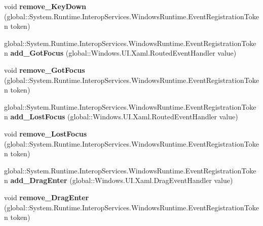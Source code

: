 \begin{DoxyCompactItemize}
void {\bfseries remove\+\_\+\+Key\+Down} (global\+::\+System.\+Runtime.\+Interop\+Services.\+Windows\+Runtime.\+Event\+Registration\+Token token)
\item 
\mbox{\label{interface_windows_1_1_u_i_1_1_xaml_1_1_i_u_i_element_a96e9e3b3d2456f96d2113018911c4223}} 
global\+::\+System.\+Runtime.\+Interop\+Services.\+Windows\+Runtime.\+Event\+Registration\+Token {\bfseries add\+\_\+\+Got\+Focus} (global\+::\+Windows.\+U\+I.\+Xaml.\+Routed\+Event\+Handler value)
\item 
\mbox{\label{interface_windows_1_1_u_i_1_1_xaml_1_1_i_u_i_element_ac7da9e77287c0c2d8bdfd22d90914fb3}} 
void {\bfseries remove\+\_\+\+Got\+Focus} (global\+::\+System.\+Runtime.\+Interop\+Services.\+Windows\+Runtime.\+Event\+Registration\+Token token)
\item 
\mbox{\label{interface_windows_1_1_u_i_1_1_xaml_1_1_i_u_i_element_a8eff735911e4175474bbec6b8aa79b15}} 
global\+::\+System.\+Runtime.\+Interop\+Services.\+Windows\+Runtime.\+Event\+Registration\+Token {\bfseries add\+\_\+\+Lost\+Focus} (global\+::\+Windows.\+U\+I.\+Xaml.\+Routed\+Event\+Handler value)
\item 
\mbox{\label{interface_windows_1_1_u_i_1_1_xaml_1_1_i_u_i_element_a735a5482f18ebef41ee23b3508022834}} 
void {\bfseries remove\+\_\+\+Lost\+Focus} (global\+::\+System.\+Runtime.\+Interop\+Services.\+Windows\+Runtime.\+Event\+Registration\+Token token)
\item 
\mbox{\label{interface_windows_1_1_u_i_1_1_xaml_1_1_i_u_i_element_a2fed84aaafd99d2ab6c95997a486fc7a}} 
global\+::\+System.\+Runtime.\+Interop\+Services.\+Windows\+Runtime.\+Event\+Registration\+Token {\bfseries add\+\_\+\+Drag\+Enter} (global\+::\+Windows.\+U\+I.\+Xaml.\+Drag\+Event\+Handler value)
\item 
\mbox{\label{interface_windows_1_1_u_i_1_1_xaml_1_1_i_u_i_element_a5a5960af1b1feea08a32346a9df72973}} 
void {\bfseries remove\+\_\+\+Drag\+Enter} (global\+::\+System.\+Runtime.\+Interop\+Services.\+Windows\+Runtime.\+Event\+Registration\+Token token)

\end{DoxyCompactItemize}
